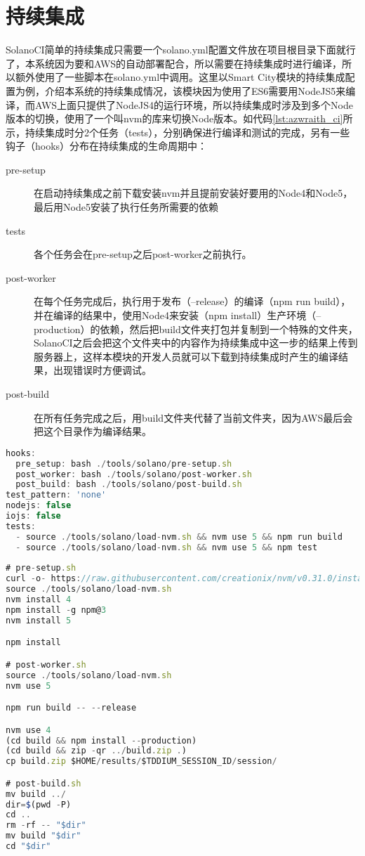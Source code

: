 \section{持续集成}
SolanoCI简单的持续集成只需要一个solano.yml配置文件放在项目根目录下面就行了，本系统因为要和AWS的自动部署配合，所以需要在持续集成时进行编译，所以额外使用了一些脚本在solano.yml中调用。这里以Smart City模块的持续集成配置为例，介绍本系统的持续集成情况，该模块因为使用了ES6需要用NodeJS5来编译，而AWS上面只提供了NodeJS4的运行环境，所以持续集成时涉及到多个Node版本的切换，使用了一个叫nvm的库来切换Node版本。如代码\ref{lst:azwraith_ci}所示，持续集成时分2个任务（tests），分别确保进行编译和测试的完成，另有一些钩子（hooks）分布在持续集成的生命周期中：
\begin{description}
  \item[pre-setup] 在启动持续集成之前下载安装nvm并且提前安装好要用的Node4和Node5，最后用Node5安装了执行任务所需要的依赖
  \item[tests] 各个任务会在pre-setup之后post-worker之前执行。
  \item[post-worker] 在每个任务完成后，执行用于发布（--release）的编译（npm run build），并在编译的结果中，使用Node4来安装（npm install）生产环境（--production）的依赖，然后把build文件夹打包并复制到一个特殊的文件夹，SolanoCI之后会把这个文件夹中的内容作为持续集成中这一步的结果上传到服务器上，这样本模块的开发人员就可以下载到持续集成时产生的编译结果，出现错误时方便调试。
  \item[post-build] 在所有任务完成之后，用build文件夹代替了当前文件夹，因为AWS最后会把这个目录作为编译结果。
\end{description}

\begin{lstlisting}[language={JavaScript}, label={lst:azwraith_ci}, caption={Smart City模块持续集成配置}]
hooks:
  pre_setup: bash ./tools/solano/pre-setup.sh
  post_worker: bash ./tools/solano/post-worker.sh
  post_build: bash ./tools/solano/post-build.sh
test_pattern: 'none'
nodejs: false
iojs: false
tests:
  - source ./tools/solano/load-nvm.sh && nvm use 5 && npm run build
  - source ./tools/solano/load-nvm.sh && nvm use 5 && npm test
  
# pre-setup.sh
curl -o- https://raw.githubusercontent.com/creationix/nvm/v0.31.0/install.sh | bash
source ./tools/solano/load-nvm.sh
nvm install 4
npm install -g npm@3
nvm install 5

npm install

# post-worker.sh
source ./tools/solano/load-nvm.sh
nvm use 5

npm run build -- --release

nvm use 4
(cd build && npm install --production)
(cd build && zip -qr ../build.zip .)
cp build.zip $HOME/results/$TDDIUM_SESSION_ID/session/

# post-build.sh
mv build ../
dir=$(pwd -P)
cd ..
rm -rf -- "$dir"
mv build "$dir"
cd "$dir"
\end{lstlisting}

